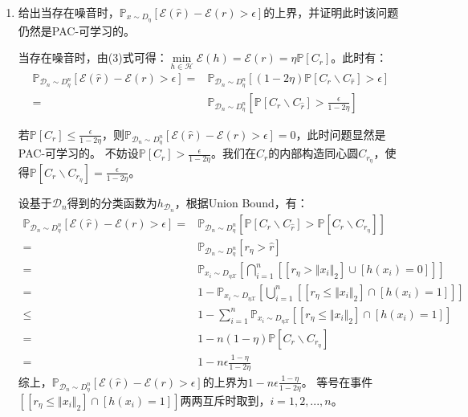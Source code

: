 \documentclass[12pt, a4paper]{article}
\newcommand{\under}[1]{\mathop{#1}\limits_}
\newcommand{\norm}[1]{{\Vert #1 \Vert_2}}
\newcommand{\prob}{{\mathbb{P}}}
\newcommand{\EE}{{\mathcal{E}}}
\newcommand{\XX}{{\mathcal{X}}}
\newcommand{\HH}{{\mathcal{H}}}
\newcommand{\DD}{{\mathcal{D}}}
\newcommand{\rh}{{\widehat{r}}}
\begin{document}
\begin{enumerate}
    \item 给出当存在噪音时，$\prob_{x \sim D_\eta} [\EE(\rh) - \EE(r) > \epsilon]$的上界，并证明此时该问题仍然是PAC-可学习的。

        当存在噪音时，由(3)式可得：$\under{\min}{h \in \HH} \EE(h) = \EE(r) = \eta \prob[C_r]$。此时有：
        \begin{align*}
        \prob_{\DD_n \sim D_\eta^n} [\EE(\rh) - \EE(r) > \epsilon]
        =& \prob_{\DD_n \sim D_\eta^n} [(1 - 2 \eta) \prob[C_r \backslash C_\rh] > \epsilon] \\
        =& \prob_{\DD_n \sim D_\eta^n} [\prob[C_r \backslash C_\rh] > \frac{\epsilon}{1 - 2 \eta}]
        \end{align*}

        若$\prob[C_r] \le \frac{\epsilon}{1 - 2 \eta}$，则$\prob_{\DD_n \sim D_\eta^n} [\EE(\rh) - \EE(r) > \epsilon] = 0$，此时问题显然是PAC-可学习的。
        不妨设$\prob[C_r] > \frac{\epsilon}{1 - 2 \eta}$。我们在$C_r$的内部构造同心圆$C_{r_\eta}$，使得$\prob[C_r \backslash C_{r_\eta}] = \frac{\epsilon}{1 - 2 \eta}$。

        设基于$\DD_n$得到的分类函数为$h_{\DD_n}$，根据Union Bound，有：
        \begin{align*}
        \prob_{\DD_n \sim D_\eta^n} [\EE(\rh) - \EE(r) > \epsilon]
        =& \prob_{\DD_n \sim D_\eta^n} [\prob[C_r \backslash C_\rh] > \prob[C_r \backslash C_{r_\eta}]] \\
        =& \prob_{\DD_n \sim D_\eta^n} [r_\eta > \rh] \\
        =& \prob_{x_i \sim D_{\eta \XX}}[\bigcap_{i = 1}^{n} [[r_\eta > \norm{x_i}] \cup [h(x_i) = 0]]] \\
        =& 1 - \prob_{x_i \sim D_{\eta \XX}}[\bigcup_{i = 1}^{n} [[r_\eta \le \norm{x_i}] \cap [h(x_i) = 1]]] \\
        \le& 1 - \sum_{i = 1}^{n} \prob_{x_i \sim D_{\eta \XX}}[[r_\eta \le \norm{x_i}] \cap [h(x_i) = 1]] \\
        =& 1 - n (1 - \eta) \prob[C_r \backslash C_{r_\eta}] \\
        =& 1 - n \epsilon \frac{1 - \eta}{1 - 2 \eta}
        \end{align*}
        综上，$\prob_{\DD_n \sim D_\eta^n} [\EE(\rh) - \EE(r) > \epsilon]$的上界为$1 - n \epsilon \frac{1 - \eta}{1 - 2 \eta}$。
        等号在事件$[[r_\eta \le \norm{x_i}] \cap [h(x_i) = 1]]$两两互斥时取到，$i = 1, 2, ..., n$。


\end{enumerate}
\end{document}
